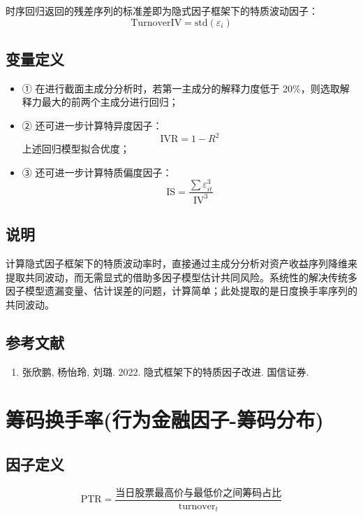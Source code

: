 \documentclass{article}
\begin{document}
时序回归返回的残差序列的标准差即为隐式因子框架下的特质波动因子：
\begin{equation}
    \mathrm{TurnoverIV} = \mathrm{std}(\varepsilon_i)
\end{equation}

\subsection{变量定义}
\begin{itemize}
    \item ① 在进行截面主成分分析时，若第一主成分的解释力度低于 20\%，则选取解释力最大的前两个主成分进行回归；
    \item ② 还可进一步计算特异度因子：
        \begin{equation*}
            \mathrm{IVR} = 1 - R^2
        \end{equation*}
        上述回归模型拟合优度；
    \item ③ 还可进一步计算特质偏度因子：
        \begin{equation*}
            \mathrm{IS} = \frac{\sum \varepsilon_{it}^3}{\mathrm{IV}^3}
        \end{equation*}
\end{itemize}

\subsection{说明}
计算隐式因子框架下的特质波动率时，直接通过主成分分析对资产收益序列降维来提取共同波动，而无需显式的借助多因子模型估计共同风险。系统性的解决传统多因子模型遗漏变量、估计误差的问题，计算简单；此处提取的是日度换手率序列的共同波动。

\subsection{参考文献}
\begin{enumerate}
    \item 张欣鹏, 杨怡玲, 刘璐. 2022. 隐式框架下的特质因子改进. 国信证券.
\end{enumerate}

\section{筹码换手率(行为金融因子-筹码分布)}

\subsection{因子定义}
\begin{equation}
    \mathrm{PTR} = \frac{\text{当日股票最高价与最低价之间筹码占比}}{\mathrm{turnover}_t}
\end{equation}
\end{document}
